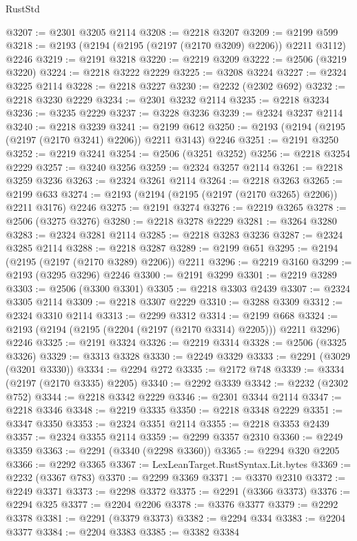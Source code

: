 \begin{lexlean}{RustStd}
\begin{coremodule}
{\begin{coremodule}
{{{{{{{{{{{{{{{{{{{{{{{{{{@3207 := @2301 @3205 @2114
@3208 := @2218 @3207
@3209 := @2199 @599
@3218 := @2193 (@2194 (@2195 (@2197 (@2170 @3209) @2206)) @2211 @3112) @2246
@3219 := @2191 @3218
@3220 := @2219 @3209
@3222 := @2506 (@3219 @3220)
@3224 := @2218 @3222 @2229
@3225 := @3208 @3224
@3227 := @2324 @3225 @2114
@3228 := @2218 @3227
@3230 := @2232 (@2302 @692)
@3232 := @2218 @3230 @2229
@3234 := @2301 @3232 @2114
@3235 := @2218 @3234
@3236 := @3235 @2229
@3237 := @3228 @3236
@3239 := @2324 @3237 @2114
@3240 := @2218 @3239
@3241 := @2199 @612
@3250 := @2193 (@2194 (@2195 (@2197 (@2170 @3241) @2206)) @2211 @3143) @2246
@3251 := @2191 @3250
@3252 := @2219 @3241
@3254 := @2506 (@3251 @3252)
@3256 := @2218 @3254 @2229
@3257 := @3240 @3256
@3259 := @2324 @3257 @2114
@3261 := @2218 @3259 @3236
@3263 := @2324 @3261 @2114
@3264 := @2218 @3263
@3265 := @2199 @633
@3274 := @2193 (@2194 (@2195 (@2197 (@2170 @3265) @2206)) @2211 @3176) @2246
@3275 := @2191 @3274
@3276 := @2219 @3265
@3278 := @2506 (@3275 @3276)
@3280 := @2218 @3278 @2229
@3281 := @3264 @3280
@3283 := @2324 @3281 @2114
@3285 := @2218 @3283 @3236
@3287 := @2324 @3285 @2114
@3288 := @2218 @3287
@3289 := @2199 @651
@3295 := @2194 (@2195 (@2197 (@2170 @3289) @2206)) @2211
@3296 := @2219 @3160
@3299 := @2193 (@3295 @3296) @2246
@3300 := @2191 @3299
@3301 := @2219 @3289
@3303 := @2506 (@3300 @3301)
@3305 := @2218 @3303 @2439
@3307 := @2324 @3305 @2114
@3309 := @2218 @3307 @2229
@3310 := @3288 @3309
@3312 := @2324 @3310 @2114
@3313 := @2299 @3312
@3314 := @2199 @668
@3324 := @2193 (@2194 (@2195 (@2204 (@2197 (@2170 @3314) @2205))) @2211 @3296) @2246
@3325 := @2191 @3324
@3326 := @2219 @3314
@3328 := @2506 (@3325 @3326)
@3329 := @3313 @3328
@3330 := @2249 @3329
@3333 := @2291 (@3029 (@3201 @3330))
@3334 := @2294 @272
@3335 := @2172 @748
@3339 := @3334 (@2197 (@2170 @3335) @2205)
@3340 := @2292 @3339
@3342 := @2232 (@2302 @752)
@3344 := @2218 @3342 @2229
@3346 := @2301 @3344 @2114
@3347 := @2218 @3346
@3348 := @2219 @3335
@3350 := @2218 @3348 @2229
@3351 := @3347 @3350
@3353 := @2324 @3351 @2114
@3355 := @2218 @3353 @2439
@3357 := @2324 @3355 @2114
@3359 := @2299 @3357 @2310
@3360 := @2249 @3359
@3363 := @2291 (@3340 (@2298 @3360))
@3365 := @2294 @320 @2205
@3366 := @2292 @3365
@3367 := LexLeanTarget.RustSyntax.Lit.bytes
@3369 := @2232 (@3367 @783)
@3370 := @2299 @3369
@3371 := @3370 @2310
@3372 := @2249 @3371
@3373 := @2298 @3372
@3375 := @2291 (@3366 @3373)
@3376 := @2294 @325
@3377 := @2204 @2206
@3378 := @3376 @3377
@3379 := @2292 @3378
@3381 := @2291 (@3379 @3373)
@3382 := @2294 @334
@3383 := @2204 @3377
@3384 := @2204 @3383
@3385 := @3382 @3384
}}}}}}}}}}}}}}}}}}}}}}}}}}
\end{coremodule}}
\end{coremodule}
\end{lexlean}
